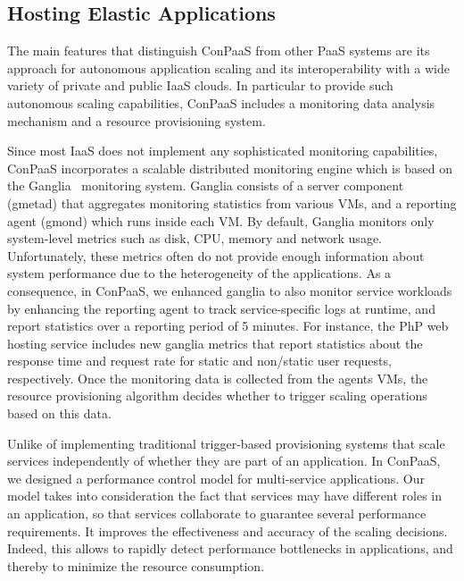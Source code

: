 
\subsection{Hosting Elastic Applications}

The main features that distinguish ConPaaS from other PaaS systems are its approach for autonomous application scaling and its interoperability with a wide variety of private and public IaaS clouds. In particular to provide such autonomous scaling capabilities, ConPaaS includes a monitoring data analysis mechanism  and a resource provisioning system.

Since most IaaS does not implement any sophisticated monitoring capabilities, ConPaaS incorporates a scalable distributed monitoring engine which is based on the Ganglia~\cite{ganglia} monitoring system. Ganglia consists of a server component (gmetad) that aggregates monitoring statistics from various VMs, and a reporting agent (gmond) which runs inside each VM. By default, Ganglia monitors only system-level metrics such as disk, CPU, memory and network usage. Unfortunately, these metrics often do not provide enough information about system performance due to the heterogeneity of the applications. As a consequence, in ConPaaS, we enhanced ganglia to also monitor service workloads by enhancing the reporting agent to track service-specific logs at runtime, and report statistics over a reporting period of 5 minutes. For instance, the PhP web hosting service includes new ganglia metrics that report statistics about the response time and request rate for static and non/static user requests, respectively. Once the monitoring data is collected from the agents VMs, the resource provisioning  algorithm decides whether to trigger scaling operations based on this data. 

Unlike of implementing traditional trigger-based provisioning systems that scale services independently of whether they are part of an application. In ConPaaS, we designed a performance control model for multi-service applications. Our model takes into consideration the fact that services may have different roles in an application, so that services collaborate to guarantee several performance requirements. It improves the effectiveness and accuracy of the scaling decisions. Indeed, this allows to rapidly detect performance bottlenecks in applications, and thereby to minimize the resource consumption.


